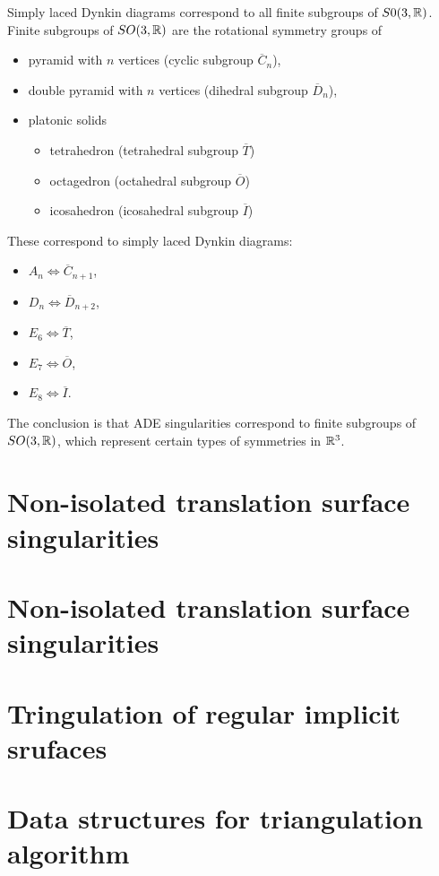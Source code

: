 Simply laced Dynkin diagrams correspond to all finite subgroups of
$S0(3,\mathbb{R})$. Finite subgroups of
$SO(3,\mathbb{R})$ are the rotational symmetry groups of
\begin{itemize}
    \item pyramid with $n$ vertices (cyclic subgroup $\overline{C}_n$),
    \item double pyramid with $n$ vertices (dihedral subgroup $\overline{D}_n$),
    \item platonic solids
    \begin{itemize}
        \item tetrahedron (tetrahedral subgroup $\overline{T}$)
        \item octagedron (octahedral subgroup $\overline{O}$)
        \item icosahedron (icosahedral subgroup $\overline{I}$)
    \end{itemize}
\end{itemize}

These correspond to simply laced Dynkin diagrams:
\begin{itemize}
    \item $A_n \iff \overline{C}_{n+1}$,
    \item $D_n \iff \overline{D}_{n+2}$,
    \item $E_6 \iff \overline{T}$,
    \item $E_7 \iff \overline{O}$,
    \item $E_8 \iff \overline{I}$.
\end{itemize}

The conclusion is that ADE singularities correspond to finite subgroups of
$SO(3, \mathbb{R})$, which represent certain types of symmetries in $\mathbb{R}^3$.

\section{Non-isolated translation surface singularities}
\label{sub2.3}

\section{Non-isolated translation surface singularities}
\label{sub2.4}

\section{Tringulation of regular implicit srufaces}
\label{sub2.5}

\section{Data structures for triangulation algorithm}
\label{sub2.6}
